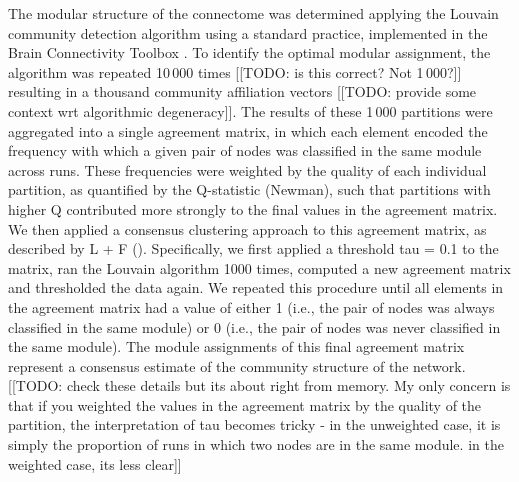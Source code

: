\documentclass[10pt,letterpaper]{article}
\begin{document}
The modular structure of the connectome was determined applying the Louvain community detection algorithm using a standard practice, implemented in the Brain Connectivity Toolbox \cite{Rubinov2010}.
To identify the optimal modular assignment, the algorithm was repeated 10\,000 times [[TODO: is this correct? Not 1\,000?]] resulting in a thousand community affiliation vectors [[TODO: provide some context wrt algorithmic degeneracy]].
The results of these 1\,000 partitions were aggregated into a single agreement matrix, in which each element encoded the frequency with which a given pair of nodes was classified in the same module across runs.
These frequencies were weighted by the quality of each individual partition, as quantified by the Q-statistic (Newman), such that partitions with higher Q contributed more strongly to the final values in the agreement matrix.
We then applied a consensus clustering approach to this agreement matrix, as described by L + F ().
Specifically, we first applied a threshold tau = 0.1 to the matrix, ran the Louvain algorithm 1000 times, computed a new agreement matrix and thresholded the data again.
We repeated this procedure until all elements in the agreement matrix had a value of either 1 (i.e., the pair of nodes was always classified in the same module) or 0 (i.e., the pair of nodes was never classified in the same module).
The module assignments of this final agreement matrix represent a consensus estimate of the community structure of the network.
[[TODO: check these details but its about right from memory. My only concern is that if you weighted the values in the agreement matrix by the quality of the partition, the interpretation of tau becomes tricky - in the unweighted case, it is simply the proportion of runs in which two nodes are in the same module. in the weighted case, its less clear]]


\end{document}

